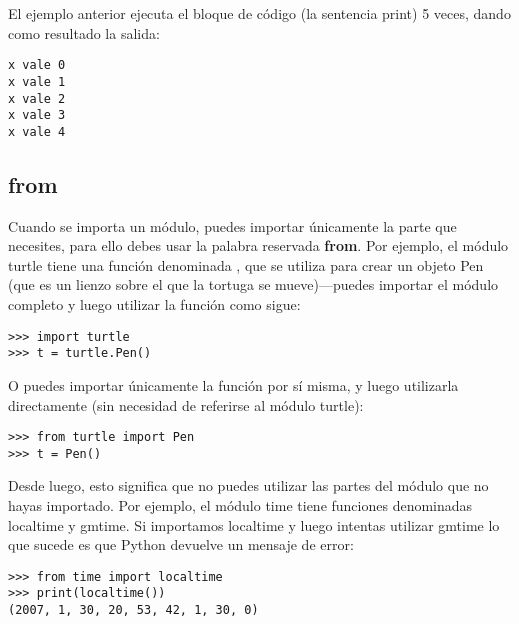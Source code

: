 \noindent
El ejemplo anterior ejecuta el bloque de código (la sentencia print) 5 veces, dando como resultado la salida:

\begin{listing}
\begin{verbatim}
x vale 0
x vale 1
x vale 2
x vale 3
x vale 4
\end{verbatim}
\end{listing}

\subsection*{from}

Cuando se importa un módulo, puedes importar únicamente la parte que necesites, para ello debes usar la palabra reservada \textbf{from}. Por ejemplo, el módulo turtle tiene una función denominada , que se utiliza para crear un objeto Pen (que es un lienzo sobre el que la tortuga se mueve)---puedes importar el módulo completo y luego utilizar la función  como sigue:

\begin{listingignore}
\begin{verbatim}
>>> import turtle
>>> t = turtle.Pen()
\end{verbatim}
\end{listingignore}

O puedes importar únicamente la función  por sí misma, y luego utilizarla directamente (sin necesidad de referirse al módulo turtle):

\begin{listingignore}
\begin{verbatim}
>>> from turtle import Pen
>>> t = Pen()
\end{verbatim}
\end{listingignore}

Desde luego, esto significa que no puedes utilizar las partes del módulo que no hayas importado. Por ejemplo, el módulo time tiene funciones denominadas localtime y gmtime.  Si importamos localtime y luego intentas utilizar gmtime lo que sucede es que Python devuelve un mensaje de error:

\begin{listingignore}
\begin{verbatim}
>>> from time import localtime
>>> print(localtime())
(2007, 1, 30, 20, 53, 42, 1, 30, 0)
\end{verbatim}
\end{listingignore}

